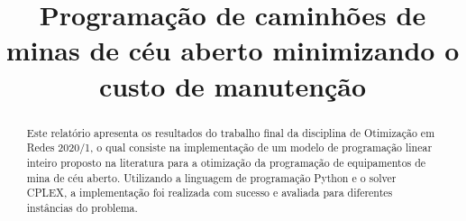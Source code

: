 \documentclass[conference]{IEEEtran}
\begin{document}
	
\title{Programação de caminhões de minas de céu aberto minimizando o custo de manutenção}

	
\author{
	}
	


% 




\maketitle

\begin{abstract}
	Este relatório apresenta os resultados do trabalho final da disciplina de Otimização em Redes 2020/1, o qual consiste na implementação de um modelo de programação linear inteiro proposto na literatura \cite{topal2010a} para a otimização da programação de equipamentos de mina de céu aberto. Utilizando a linguagem de programação Python e o solver CPLEX, a implementação foi realizada com sucesso e avaliada para diferentes instâncias do problema.
\end{abstract}
\end{document}
